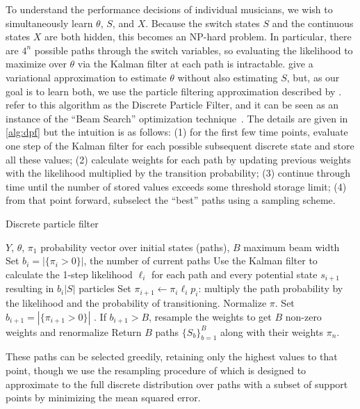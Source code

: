 \documentclass[aoas]{imsart}
\begin{document}
To understand the performance decisions of individual musicians, we
wish to simultaneously learn $\theta$, $S$, and $X$. Because the
switch states $S$ and the continuous states $X$ are both hidden, this becomes
an NP-hard problem. In particular, there are $4^n$ possible paths
through the switch variables, so evaluating the likelihood to maximize
over $\theta$ via the Kalman filter at each path is intractable. 
\citet{GhahramaniHinton2000} give a variational approximation to
estimate $\theta$ without also estimating $S$, but, as our goal is to
learn both, we use the particle filtering approximation described by
\citet{FearnheadClifford2003}. ~\cite{WhiteleyAndrieu2010} refer to
this algorithm as the Discrete Particle Filter, and it can be seen as
an instance of the ``Beam Search'' optimization
technique~\citep{Bisiani1992}. The details are given in
\autoref{alg:dpf} but the intuition is as follows: (1) for the first
few time points, evaluate
one step of the Kalman filter for each possible subsequent discrete
state and store all these values; (2) calculate weights for each path
by updating previous weights with the likelihood multiplied by the transition probability;
(3) continue through time until the number of stored values exceeds
some threshold storage limit; (4) from that point forward, subselect
the ``best'' paths using a sampling scheme.
\begin{algorithm}[t!]
  \caption{Discrete particle filter\label{alg:dpf}}
  \begin{algorithmic}[1]
  $Y$, $\theta$, $\pi_1$ probability vector over initial states
  (paths), $B$ maximum beam width
  \STATE Set $b_i=|\{\pi_i>0\}|$, the number of current paths
  \STATE Use %
  the Kalman filter to calculate the 1-step likelihood
  $\ell_i$ for each path and every potential state $s_{i+1}$ resulting in $b_i|S|$ particles
  \STATE Set $\pi_{i+1} \leftarrow \pi_i\ell_i p_i$: multiply the path
  probability by the likelihood and the probability of
  transitioning. Normalize $\pi$.
  \STATE Set $b_{i+1}=|\{\pi_{i+1}>0\}|$ . If $b_{i+1} > B$, resample the
  weights to get $B$ non-zero weights and renormalize
  \ENDFOR
  \STATE Return $B$ paths $\{S_b\}_{b=1}^B$ along with their weights $\pi_{n}$.
\end{algorithmic}
\end{algorithm}
These paths can be
selected greedily, retaining only the highest values to that point,
though we use the resampling procedure of
\citep{FearnheadClifford2003} which is designed to 
approximate to the full discrete distribution over paths with a subset
of support points by minimizing the mean squared
error.
\end{document}
